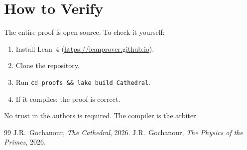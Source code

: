 \documentclass[11pt,a4paper]{article}
\begin{document}
\section{How to Verify}

The entire proof is open source. To check it yourself:

\begin{enumerate}
  \item Install Lean~4 (\url{https://leanprover.github.io}).
  \item Clone the repository.
  \item Run \texttt{cd proofs \&\& lake build Cathedral}.
  \item If it compiles: the proof is correct.
\end{enumerate}

No trust in the authors is required. The compiler is the arbiter.

\begin{thebibliography}{99}
J.R.~Gochanour, \emph{The Cathedral}, 2026.
J.R.~Gochanour, \emph{The Physics of the Primes}, 2026.
\end{thebibliography}
\end{document}

